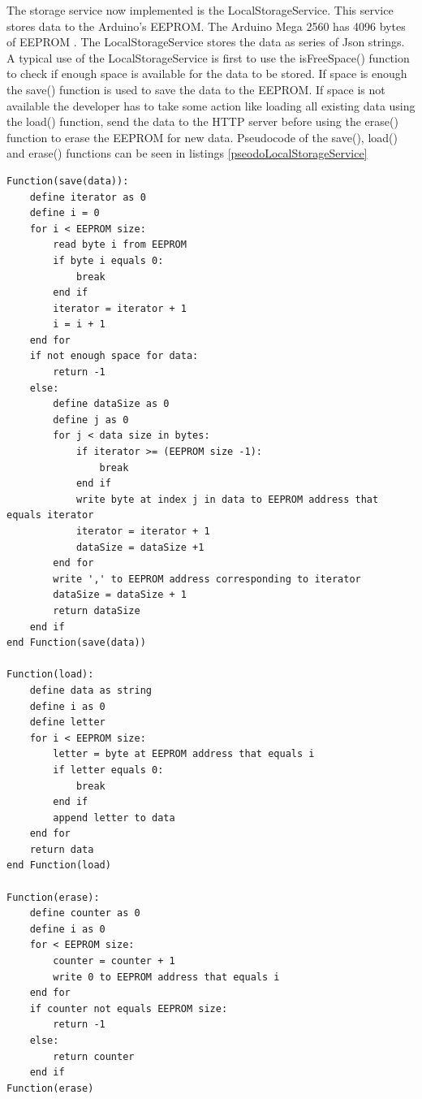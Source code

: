 The storage service now implemented is the LocalStorageService. This service stores data 
to the Arduino's EEPROM. The Arduino Mega 2560 has 4096 bytes of 
EEPROM \cite{arduinoMega}. The LocalStorageService stores the data as series of Json 
strings. A typical use of the LocalStorageService is first to use the isFreeSpace() function to check if enough space is available for the data to be stored. If space is enough the save() function is used to save the data to the EEPROM. If space is not available the developer has to take some action like loading all existing data using the load() function, send the data to the HTTP server before using the erase() function to erase the EEPROM for new data. Pseudocode of the save(), load() and erase() functions can be seen in listings \ref{pseodoLocalStorageService}

\begin{lstlisting}[frame=single, label=pseodoLocalStorageService, caption={Pseudocode of LocalStorageService save(), load() and erase() functions}]
Function(save(data)):
    define iterator as 0
    define i = 0
    for i < EEPROM size:
        read byte i from EEPROM
        if byte i equals 0:
            break
        end if
        iterator = iterator + 1
        i = i + 1
    end for
    if not enough space for data:
        return -1
    else:
        define dataSize as 0
        define j as 0
        for j < data size in bytes:
            if iterator >= (EEPROM size -1):
                break
            end if
            write byte at index j in data to EEPROM address that equals iterator
            iterator = iterator + 1
            dataSize = dataSize +1
        end for
        write ',' to EEPROM address corresponding to iterator
        dataSize = dataSize + 1
        return dataSize
    end if
end Function(save(data))

Function(load):
    define data as string
    define i as 0
    define letter
    for i < EEPROM size:
        letter = byte at EEPROM address that equals i
        if letter equals 0:
            break
        end if
        append letter to data
    end for
    return data
end Function(load)

Function(erase):
    define counter as 0
    define i as 0
    for < EEPROM size:
        counter = counter + 1
        write 0 to EEPROM address that equals i
    end for
    if counter not equals EEPROM size:
        return -1
    else:
        return counter
    end if
Function(erase)
\end{lstlisting}

